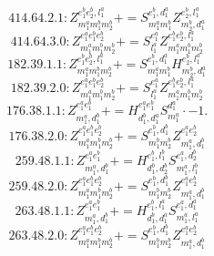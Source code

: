 \documentclass[letterpaper,10pt,fleqn,leqno,onecolumn]{article}
\begin{document}
\begin{equation} \;\;\;\;\;\;  414.64.2.1: Z^{e_{1}^{b}e_{2}^{b},l_{1}^{a}}_{m_{1}^{a}m_{1}^{b}m_{2}^{b}}+=S^{e_{1}^{b},d_{1}^{a}}_{m_{1}^{a}m_{1}^{b}}Z^{e_{2}^{b},l_{1}^{a}}_{m_{2}^{b},d_{1}^{a}} \end{equation}
\begin{equation} \;\;\;\;\;\;  414.64.3.0: Z^{e_{1}^{a}e_{1}^{b}e_{2}^{b}}_{m_{1}^{a}m_{1}^{b}m_{2}^{b}}+=S^{e_{1}^{a}}_{l_{1}^{a}}Z^{e_{1}^{b}e_{2}^{b},l_{1}^{a}}_{m_{1}^{a}m_{1}^{b}m_{2}^{b}} \end{equation}
\begin{equation} \;\;\;\;\;\;  182.39.1.1: Z^{e_{1}^{b}e_{2}^{b},l_{1}^{a}}_{m_{1}^{a}m_{1}^{b}m_{2}^{b}}+=S^{e_{1}^{b},d_{1}^{a}}_{m_{1}^{a}m_{1}^{b}}H^{e_{2}^{b},l_{1}^{a}}_{m_{2}^{b},d_{1}^{a}} \end{equation}
\begin{equation} \;\;\;\;\;\;  182.39.2.0: Z^{e_{1}^{a}e_{1}^{b}e_{2}^{b}}_{m_{1}^{a}m_{1}^{b}m_{2}^{b}}+=S^{e_{1}^{a}}_{l_{1}^{a}}Z^{e_{1}^{b}e_{2}^{b},l_{1}^{a}}_{m_{1}^{a}m_{1}^{b}m_{2}^{b}} \end{equation}
\begin{equation} \;\;\;\;\;\;  176.38.1.1: Z^{e_{1}^{a}e_{1}^{b}}_{m_{1}^{a},d_{1}^{b}}+=H^{e_{1}^{a}e_{1}^{b}}_{d_{1}^{b},d_{1}^{a}}S^{d_{1}^{a}}_{m_{1}^{a}}\cdot -1. \end{equation}
\begin{equation} \;\;\;\;\;\;  176.38.2.0: Z^{e_{1}^{a}e_{1}^{b}e_{2}^{b}}_{m_{1}^{a}m_{1}^{b}m_{2}^{b}}+=S^{e_{1}^{b},d_{1}^{b}}_{m_{1}^{b}m_{2}^{b}}Z^{e_{1}^{a}e_{2}^{b}}_{m_{1}^{a},d_{1}^{b}} \end{equation}
\begin{equation} \;\;\;\;\;\;  259.48.1.1: Z^{e_{1}^{a}e_{1}^{b}}_{m_{1}^{a},d_{1}^{b}}+=H^{e_{1}^{b},l_{1}^{b}}_{d_{1}^{b},d_{2}^{b}}S^{e_{1}^{a},d_{2}^{b}}_{m_{1}^{a},l_{1}^{b}} \end{equation}
\begin{equation} \;\;\;\;\;\;  259.48.2.0: Z^{e_{1}^{a}e_{1}^{b}e_{2}^{b}}_{m_{1}^{a}m_{1}^{b}m_{2}^{b}}+=S^{e_{1}^{b},d_{1}^{b}}_{m_{1}^{b}m_{2}^{b}}Z^{e_{1}^{a}e_{2}^{b}}_{m_{1}^{a},d_{1}^{b}} \end{equation}
\begin{equation} \;\;\;\;\;\;  263.48.1.1: Z^{e_{1}^{a}e_{1}^{b}}_{m_{1}^{a},d_{1}^{b}}+=H^{e_{1}^{b},l_{1}^{a}}_{d_{1}^{b},d_{1}^{a}}S^{e_{1}^{a},d_{1}^{a}}_{m_{1}^{a},l_{1}^{a}} \end{equation}
\begin{equation} \;\;\;\;\;\;  263.48.2.0: Z^{e_{1}^{a}e_{1}^{b}e_{2}^{b}}_{m_{1}^{a}m_{1}^{b}m_{2}^{b}}+=S^{e_{1}^{b},d_{1}^{b}}_{m_{1}^{b}m_{2}^{b}}Z^{e_{1}^{a}e_{2}^{b}}_{m_{1}^{a},d_{1}^{b}} \end{equation}
\end{document}
